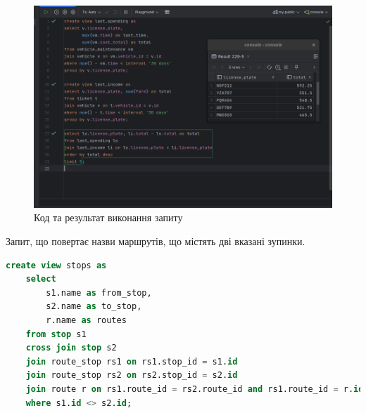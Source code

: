 \documentclass[14pt]{extreport}
\begin{document}
\begin{normalsize}

	\begin{figure}[H]
		\centering
		\includegraphics[scale=0.5]{2}
		\caption{Код та результат виконання запиту}
	\end{figure}
	\pagebreak
	Запит, що повертає назви маршрутів, що містять дві вказані зупинки.
	
	\iffalse
	\begin{lstlisting}[language=sql]
	create view stops as
	select
		s1.name as from_stop,
		s2.name as to_stop,
		r.name as routes
	from stop s1
	cross join stop s2
	join route_stop rs1 on rs1.stop_id = s1.id
	join route_stop rs2 on rs2.stop_id = s2.id
	join route r on rs1.route_id = rs2.route_id and rs1.route_id = r.id
	where s1.id <> s2.id;
	

\end{lstlisting}
\end{normalsize}
\end{document}
